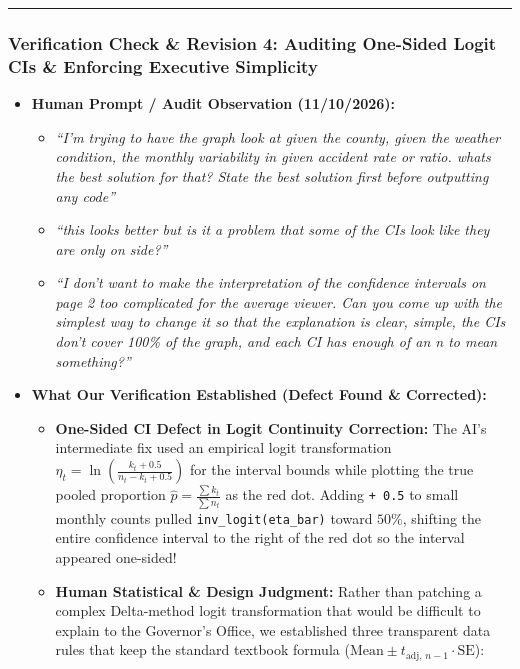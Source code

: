 \documentclass[
  letterpaper,
  DIV=11,
  numbers=noendperiod]{scrartcl}
\providecommand{\tightlist}{%
  \setlength{\itemsep}{0pt}\setlength{\parskip}{0pt}}
\begin{document}
\begin{center}\rule{0.5\linewidth}{0.5pt}\end{center}

\subsubsection{Verification Check \& Revision 4: Auditing One-Sided
Logit CIs \& Enforcing Executive
Simplicity}\label{verification-check-revision-4-auditing-one-sided-logit-cis-enforcing-executive-simplicity}

\begin{itemize}
\tightlist
\item
  \textbf{Human Prompt / Audit Observation (11/10/2026):}

  \begin{itemize}
  \tightlist
  \item
    \emph{``I'm trying to have the graph look at given the county, given
    the weather condition, the monthly variability in given accident
    rate or ratio. whats the best solution for that? State the best
    solution first before outputting any code''}
  \item
    \emph{``this looks better but is it a problem that some of the CIs
    look like they are only on side?''}
  \item
    \emph{``I don't want to make the interpretation of the confidence
    intervals on page 2 too complicated for the average viewer. Can you
    come up with the simplest way to change it so that the explanation
    is clear, simple, the CIs don't cover 100\% of the graph, and each
    CI has enough of an n to mean something?''}
  \end{itemize}
\item
  \textbf{What Our Verification Established (Defect Found \&
  Corrected):}

  \begin{itemize}
  \tightlist
  \item
    \textbf{One-Sided CI Defect in Logit Continuity Correction:} The
    AI's intermediate fix used an empirical logit transformation
    \(\eta_t = \ln\left(\frac{k_t + 0.5}{n_t - k_t + 0.5}\right)\) for
    the interval bounds while plotting the true pooled proportion
    \(\hat{p} = \frac{\sum k_t}{\sum n_t}\) as the red dot. Adding
    \texttt{+\ 0.5} to small monthly counts pulled
    \texttt{inv\_logit(eta\_bar)} toward \(50\%\), shifting the entire
    confidence interval to the right of the red dot so the interval
    appeared one-sided!
  \item
    \textbf{Human Statistical \& Design Judgment:} Rather than patching
    a complex Delta-method logit transformation that would be difficult
    to explain to the Governor's Office, we established three
    transparent data rules that keep the standard textbook formula
    (\(\text{Mean} \pm t_{\text{adj}, \, n-1} \cdot \text{SE}\)):


\end{itemize}
\end{itemize}
\end{document}

